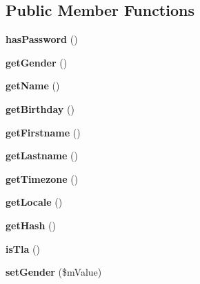 \subsection*{Public Member Functions}
\begin{DoxyCompactItemize}
\item 
\hypertarget{class_user_a3e42270f74c053e9646abfaf3aff6795}{{\bfseries has\-Password} ()}\label{class_user_a3e42270f74c053e9646abfaf3aff6795}

\item 
\hypertarget{class_user_a37936056e5dafdc7f83538ba873366ae}{{\bfseries get\-Gender} ()}\label{class_user_a37936056e5dafdc7f83538ba873366ae}

\item 
\hypertarget{class_user_a0b41f2ef1838507911322bf4107f44ac}{{\bfseries get\-Name} ()}\label{class_user_a0b41f2ef1838507911322bf4107f44ac}

\item 
\hypertarget{class_user_aa6ebef928782929f9bb598cbdeb3cdb0}{{\bfseries get\-Birthday} ()}\label{class_user_aa6ebef928782929f9bb598cbdeb3cdb0}

\item 
\hypertarget{class_user_a8b64c48534a48f71b42c046e42739234}{{\bfseries get\-Firstname} ()}\label{class_user_a8b64c48534a48f71b42c046e42739234}

\item 
\hypertarget{class_user_a17bba25fe56153018b46277eda91093b}{{\bfseries get\-Lastname} ()}\label{class_user_a17bba25fe56153018b46277eda91093b}

\item 
\hypertarget{class_user_ac14238186e330ea1a9e1b351d59321c7}{{\bfseries get\-Timezone} ()}\label{class_user_ac14238186e330ea1a9e1b351d59321c7}

\item 
\hypertarget{class_user_a1eba0bba98102d4d66c10c0bf2f1ac34}{{\bfseries get\-Locale} ()}\label{class_user_a1eba0bba98102d4d66c10c0bf2f1ac34}

\item 
\hypertarget{class_user_a90d1a1e4f8b768416e10595348e169d3}{{\bfseries get\-Hash} ()}\label{class_user_a90d1a1e4f8b768416e10595348e169d3}

\item 
\hypertarget{class_user_aa9d450d2bfba79d4ef3e838ed4becc0d}{{\bfseries is\-Tla} ()}\label{class_user_aa9d450d2bfba79d4ef3e838ed4becc0d}

\item 
\hypertarget{class_user_a29149cc15a68be01d23a6fd86eb7ed35}{{\bfseries set\-Gender} (\$m\-Value)}\label{class_user_a29149cc15a68be01d23a6fd86eb7ed35}


\end{DoxyCompactItemize}
